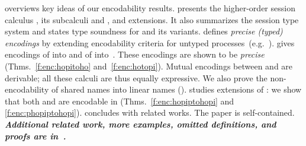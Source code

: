  overviews key ideas of our encodability results.
{} presents the higher-order session calculus \HOp, its 
subcalculi \HO and \sessp, and extensions.  
It also summarizes the session type system
and states type soundness for \HOp and its variants.
 defines \emph{precise (typed) encodings} by extending encodability criteria 
 for
untyped processes~(e.g.~\cite{DBLP:journals/iandc/Gorla10,DBLP:conf/icalp/LanesePSS10}).
{} %
gives encodings of \HOp into \HO and of \HOp into~\sessp.
These encodings 
are shown to be \emph{precise} (Thms.~\ref{f:enc:hopitoho} and~\ref{f:enc:hotopi}).
Mutual encodings between \sessp and \HO are derivable; 
all these calculi are thus equally expressive.
We also prove the non-encodability of shared names
into linear names ().
{} studies extensions of \HOp: 
we show that both \HOpp 
and \pHOp 
are encodable in \HOp
(Thms.~\ref{f:enc:hopiptohopi} and \ref{f:enc:phopiptohopi}).
{} concludes with related works. 
The paper is self-contained. 
{\bf\em Additional related work, more examples, omitted definitions, and  proofs 
are 
in~\cite{KouzapasPY15}.} 

